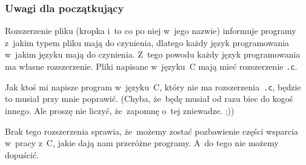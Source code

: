 \documentclass[10pt,t]{beamer}
\begin{document}
\begin{frame}
  \frametitle{Uwagi dla początkujący}


  Rozszerzenie pliku (kropka i~to co po niej w~jego nazwie) informuje
  programy z~jakim typem pliku mają do czynienia, dlatego każdy język
  programowania w~jakim języku mają do czynienia. Z~tego powodu każdy
  język programowania ma \alert{własne} rozszerzenie. Pliki napisane
  w~języku~C mają mieć rozszerzenie \texttt{.c}.

  Jak ktoś mi napisze program w~języku~C, który \alert{nie} ma
  rozszerzenia~\texttt{.c}, będzie to musiał przy mnie poprawić.
  (Chyba, że~będę musiał od razu biec do kogoś innego. Ale proszę nie
  liczyć, że~zapomnę o~tej zniewadze. ;))

  Brak tego rozszerzenia sprawia, że~możemy zostać pozbawienie części
  wsparcia w~pracy z~C, jakie dają nam przeróżne programy. A~do tego
  \alert{nie} możemy dopuścić.

\end{frame}

























\end{document}
